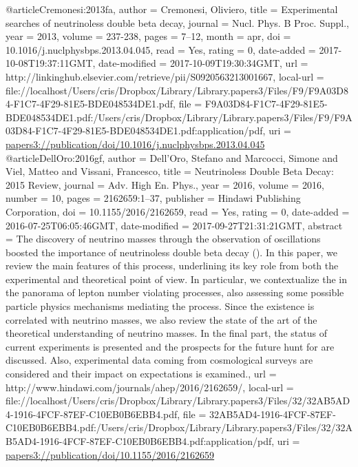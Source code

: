 @article{Cremonesi:2013fa,
author = {Cremonesi, Oliviero},
title = {{Experimental searches of neutrinoless double beta decay}},
journal = {Nucl. Phys. B Proc. Suppl.},
year = {2013},
volume = {237-238},
pages = {7--12},
month = apr,
doi = {10.1016/j.nuclphysbps.2013.04.045},
read = {Yes},
rating = {0},
date-added = {2017-10-08T19:37:11GMT},
date-modified = {2017-10-09T19:30:34GMT},
url = {http://linkinghub.elsevier.com/retrieve/pii/S0920563213001667},
local-url = {file://localhost/Users/cris/Dropbox/Library/Library.papers3/Files/F9/F9A03D84-F1C7-4F29-81E5-BDE048534DE1.pdf},
file = {{F9A03D84-F1C7-4F29-81E5-BDE048534DE1.pdf:/Users/cris/Dropbox/Library/Library.papers3/Files/F9/F9A03D84-F1C7-4F29-81E5-BDE048534DE1.pdf:application/pdf}},
uri = {\url{papers3://publication/doi/10.1016/j.nuclphysbps.2013.04.045}}
}
@article{DellOro:2016gf,
author = {Dell{\textquoteright}Oro, Stefano and Marcocci, Simone and Viel, Matteo and Vissani, Francesco},
title = {{Neutrinoless Double Beta Decay: 2015 Review}},
journal = {Adv. High En. Phys.},
year = {2016},
volume = {2016},
number = {10},
pages = {2162659:1--37},
publisher = {Hindawi Publishing Corporation},
doi = {10.1155/2016/2162659},
read = {Yes},
rating = {0},
date-added = {2016-07-25T06:05:46GMT},
date-modified = {2017-09-27T21:31:21GMT},
abstract = {The discovery of neutrino masses through the observation of oscillations boosted the importance of neutrinoless double beta decay (). In this paper, we review the main features of this process, underlining its key role from both the experimental and theoretical point of view. In particular, we contextualize the in the panorama of lepton number violating processes, also assessing some possible particle physics mechanisms mediating the process. Since the existence is correlated with neutrino masses, we also review the state of the art of the theoretical understanding of neutrino masses. In the final part, the status of current experiments is presented and the prospects for the future hunt for are discussed. Also, experimental data coming from cosmological surveys are considered and their impact on expectations is examined.},
url = {http://www.hindawi.com/journals/ahep/2016/2162659/},
local-url = {file://localhost/Users/cris/Dropbox/Library/Library.papers3/Files/32/32AB5AD4-1916-4FCF-87EF-C10EB0B6EBB4.pdf},
file = {{32AB5AD4-1916-4FCF-87EF-C10EB0B6EBB4.pdf:/Users/cris/Dropbox/Library/Library.papers3/Files/32/32AB5AD4-1916-4FCF-87EF-C10EB0B6EBB4.pdf:application/pdf}},
uri = {\url{papers3://publication/doi/10.1155/2016/2162659}}
}

